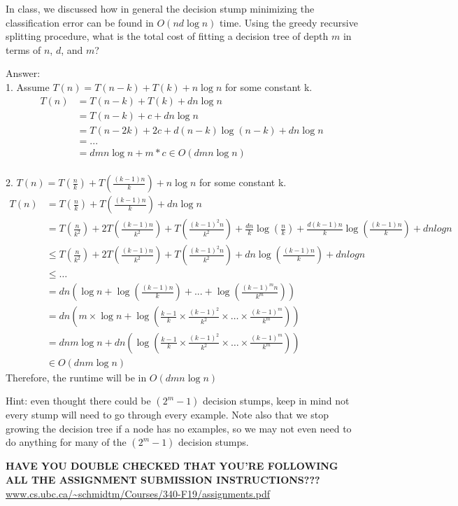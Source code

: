 \documentclass{article}
\def\ans#1{\par\gre{Answer: #1}}
\def\blu#1{{\color{blu}#1}}
\def\gre#1{{\color{gre}#1}}
\begin{document}
In class, we discussed how in general the decision stump minimizing the classification error can be found in $O(nd\log n)$ time. Using the greedy recursive splitting procedure, \blu{what is the total cost of fitting a decision tree of depth $m$ in terms of $n$, $d$, and $m$?} 
\ans{\\
    1. Assume $T(n) = T(n-k)+T(k) + n \log n$ for some constant k. \\
\begin{align*}
T(n) &= T(n-k) +T(k) + d n \log n \\ &=T(n-k) + c + d n \log n \\ &= T(n-2k) + 2c + d (n-k) \log (n-k) + d n\log n
\\ &= ... \\&= d m n \log n + m*c \in O(dmn \log n)
\end{align*}    
    \\ 
    2. $T(n) = T(\frac{n}{k}) + T(\frac{(k-1)n}{k}) + n \log n$ for some constant k.
    \begin{align*}
        T(n) &= T(\frac{n}{k}) + T(\frac{(k-1)n}{k}) + d n \log n \\
        &= T(\frac{n}{k^2}) + 2 T(\frac{(k-1)n}{k^2}) + T(\frac{(k-1)^2n}{k^2}) + \frac{dn}{k} \log (\frac{n}{k}) + \frac{d(k-1)n}{k} \log (\frac{(k-1)n}{k}) + d n logn\\
        & \leq T(\frac{n}{k^2}) + 2 T(\frac{(k-1)n}{k^2}) + T(\frac{(k-1)^2n}{k^2}) + dn \log(\frac{(k-1)n}{k}) + d n logn \\ 
        & \leq \dots \\ 
        &= dn (\log n + \log (\frac{(k-1)n}{k})+ ... + \log(\frac{(k-1)^mn}{k^m})) \\
        &= dn (m \times \log n + \log(\frac{k-1}{k} \times \frac{(k-1)^2}{k^2} \times \dots \times\frac{(k-1)^m}{k^m})) \\ 
        &= dnm\log n + dn (\log(\frac{k-1}{k} \times \frac{(k-1)^2}{k^2} \times \dots \times\frac{(k-1)^m}{k^m})) \\ 
        &\in O(dnm\log n)
    \end{align*}
    Therefore, the runtime will be in $O(dmn\log n)$
}

Hint: even thought there could be $(2^m-1)$ decision stumps, keep in mind not every stump will need to go through every example. Note also that we stop growing the decision tree if a node has no examples, so we may not even need to do anything for many of the $(2^m-1)$ decision stumps.

\vspace{25pt}
\textbf{HAVE YOU DOUBLE CHECKED THAT YOU'RE FOLLOWING ALL THE ASSIGNMENT SUBMISSION INSTRUCTIONS???}\\
\url{www.cs.ubc.ca/~schmidtm/Courses/340-F19/assignments.pdf}
\end{document}
